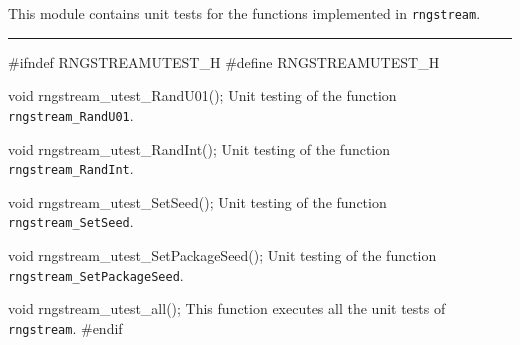 
This module contains unit tests for the functions implemented in {\tt rngstream}. 

\bigskip
\hrule
\code
\hide
#ifndef RNGSTREAMUTEST_H
#define RNGSTREAMUTEST_H
\endhide
\endcode

\code
void rngstream_utest_RandU01();
\endcode
 \tab  Unit testing of the function {\tt rngstream\_RandU01}.
 \endtab
\code

void rngstream_utest_RandInt();
\endcode
 \tab  Unit testing of the function {\tt rngstream\_RandInt}.
 \endtab
\code

void rngstream_utest_SetSeed();
\endcode
 \tab  Unit testing of the function {\tt rngstream\_SetSeed}.
 \endtab
\code

void rngstream_utest_SetPackageSeed();
\endcode
 \tab  Unit testing of the function {\tt rngstream\_SetPackageSeed}.
 \endtab
\code

void rngstream_utest_all();
\endcode
 \tab  This function executes all the unit tests of {\tt rngstream}.
 \endtab
\code
\hide
#endif
\endhide
\endcode
